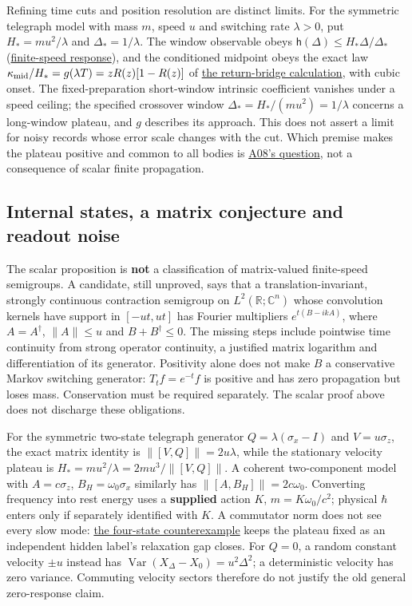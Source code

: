 \documentclass[11pt,a4paper]{article}
\begin{document}
Refining time cuts and position resolution are distinct limits. For the
symmetric telegraph model with mass \(m\), speed \(u\) and switching
rate \(\lambda>0\), put \(H_*=mu^2/\lambda\) and \(\Delta_*=1/\lambda\).
The window observable obeys \(\mathsf h(\Delta)\le H_*\Delta/\Delta_*\)
(\href{susceptibility-gap.md}{finite-speed response}), and the
conditioned midpoint obeys the exact law
\(\kappa_{\rm mid}/H_*=g(\lambda T)=zR(z)[1-R(z)]\) of
\href{telegraph-return-bridge.md}{the return-bridge calculation}, with
cubic onset. The fixed-preparation short-window intrinsic coefficient
vanishes under a speed ceiling; the specified crossover window
\(\Delta_*=H_*/(mu^2)=1/\lambda\) concerns a long-window plateau, and
\(g\) describes its approach. This does not assert a limit for noisy
records whose error scale changes with the cut. Which premise makes the
plateau positive and common to all bodies is
\href{composition-universality.md}{A08's question}, not a consequence of
scalar finite propagation.

\hypertarget{internal-states-a-matrix-conjecture-and-readout-noise}{%
\subsection{Internal states, a matrix conjecture and readout
noise}\label{internal-states-a-matrix-conjecture-and-readout-noise}}

The scalar proposition is \textbf{not} a classification of matrix-valued
finite-speed semigroups. A candidate, still unproved, says that a
translation-invariant, strongly continuous contraction semigroup on
\(L^2(\mathbb R;\mathbb C^n)\) whose convolution kernels have support in
\([-ut,ut]\) has Fourier multipliers \(e^{t(B-ikA)}\), where
\(A=A^\dagger\), \(\|A\|\le u\) and \(B+B^\dagger\le0\). The missing
steps include pointwise time continuity from strong operator continuity,
a justified matrix logarithm and differentiation of its generator.
Positivity alone does not make \(B\) a conservative Markov switching
generator: \(T_tf=e^{-t}f\) is positive and has zero propagation but
loses mass. Conservation must be required separately. The scalar proof
above does not discharge these obligations.

For the symmetric two-state telegraph generator
\(Q=\lambda(\sigma_x-I)\) and \(V=u\sigma_z\), the exact matrix identity
is \(\|[V,Q]\|=2u\lambda\), while the stationary velocity plateau is
\(H_*=mu^2/\lambda=2mu^3/\|[V,Q]\|\). A coherent two-component model
with \(A=c\sigma_z\), \(B_H=\omega_0\sigma_x\) similarly has
\(\|[A,B_H]\|=2c\omega_0\). Converting frequency into rest energy uses a
\textbf{supplied} action \(K\), \(m=K\omega_0/c^2\); physical \(\hbar\)
enters only if separately identified with \(K\). A commutator norm does
not see every slow mode:
\href{susceptibility-gap.md\#3-fixed-plateau-with-a-closing-full-gap-c041}{the
four-state counterexample} keeps the plateau fixed as an independent
hidden label's relaxation gap closes. For \(Q=0\), a random constant
velocity \(\pm u\) instead has
\(\operatorname{Var}(X_\Delta-X_0)=u^2\Delta^2\); a deterministic
velocity has zero variance. Commuting velocity sectors therefore do not
justify the old general zero-response claim.
\end{document}
